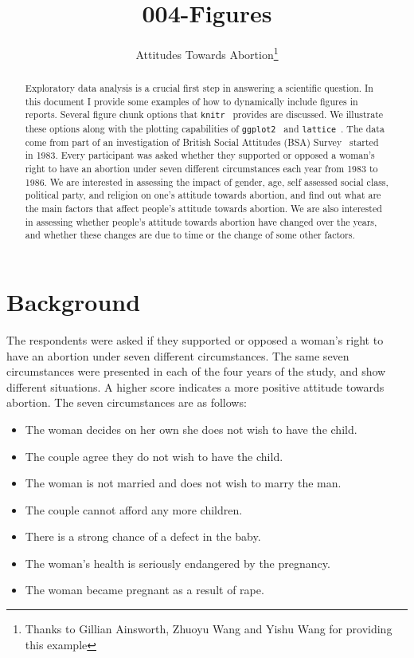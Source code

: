 \documentclass[11pt,letter]{article}\usepackage[]{graphicx}\usepackage[]{color}
\begin{document}
\pagestyle{fancy}

\title{004-Figures}
\author{Attitudes Towards Abortion\thanks{Thanks to Gillian Ainsworth, Zhuoyu Wang and Yishu Wang for providing this example}}
\maketitle








\begin{abstract}
Exploratory data analysis is a crucial first step in answering a scientific question. In this document I provide some examples of how to dynamically include figures in reports. Several figure chunk options that \texttt{knitr}~\citep{k1,k2,k3} provides are discussed. We illustrate these options along with the plotting capabilities of \texttt{ggplot2}~\citep{ggplot2} and \texttt{lattice}~\citep{lattice}. The data come from part of an investigation of British Social Attitudes (BSA) Survey~\citep{mcgrath1986british} started in 1983. Every participant was asked whether they supported or opposed a woman's right to have an abortion under seven different circumstances each year from 1983 to 1986. We are interested in assessing the impact of gender, age, self assessed social class, political party, and religion on one's attitude towards abortion, and find out what are the main factors that affect people's attitude towards abortion.  We are also interested in assessing whether people's attitude towards abortion have changed over the years, and whether these changes are due to time or the change of some other factors.  
\end{abstract}


\section{Background}

The respondents were asked if they supported or opposed a woman's right to have an abortion under seven different circumstances.   The same seven circumstances were presented in each of the four years of the study, and show different situations. A higher score indicates a more positive attitude towards abortion. The seven circumstances are as follows:

\begin{itemize}
\item[1] The woman decides on her own she does not wish to have the child.  
\item[2] The couple agree they do not wish to have the child.  
\item[3] The woman is not married and does not wish to marry the man.  
\item[4] The couple cannot afford any more children.  
\item[5] There is a strong chance of a defect in the baby.  
\item[6] The woman's health is seriously endangered by the pregnancy.  
\item[7] The woman became pregnant as a result of rape.  
\end{itemize}
\end{document}
